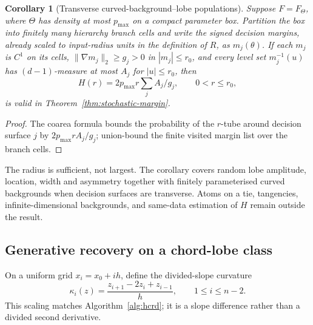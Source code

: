\documentclass[review,onefignum,onetabnum]{siamonline250211}
\newtheorem{corollary}{Corollary}
\begin{document}
\begin{corollary}[Transverse curved-background--lobe populations]
\label{cor:stochastic-margin}
Suppose $F=F_\Theta$, where $\Theta$ has density at most $p_{\max}$ on a
compact parameter box.  Partition the box into finitely many hierarchy branch
cells and write the signed decision margins, already scaled to input-radius
units in the definition of $R$, as $m_j(\theta)$.  If each $m_j$ is $C^1$ on
its cells, $\|\nabla m_j\|_2\ge g_j>0$ in $|m_j|\le r_0$, and every level set
$m_j^{-1}(u)$ has $(d-1)$-measure at most $A_j$ for $|u|\le r_0$, then
\begin{equation}
 H(r)=2p_{\max}r\sum_j A_j/g_j,\qquad 0<r\le r_0,
\end{equation}
is valid in Theorem~\ref{thm:stochastic-margin}.
\end{corollary}
\begin{proof}
The coarea formula bounds the probability of the $r$-tube around decision
surface $j$ by $2p_{\max}rA_j/g_j$; union-bound the finite visited margin list
over the branch cells.
\end{proof}

The radius is sufficient, not largest.  The corollary covers random lobe
amplitude, location, width and asymmetry together with finitely parameterised
curved backgrounds when decision surfaces are transverse.  Atoms on a tie,
tangencies, infinite-dimensional backgrounds, and same-data estimation of
$H$ remain outside the result.
\fi

\subsection{Generative recovery on a chord-lobe class}
On a uniform grid $x_i=x_0+ih$, define the divided-slope curvature
\begin{equation}
 \kappa_i(z)=\frac{z_{i+1}-2z_i+z_{i-1}}{h},\qquad 1\le i\le n-2.
\end{equation}
This scaling matches Algorithm~\ref{alg:hcrd}; it is a slope difference rather
than a divided second derivative.
\end{document}
